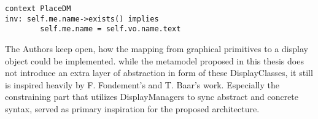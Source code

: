\begin{lstlisting}[language=OCL]
context PlaceDM
inv: self.me.name->exists() implies
        self.me.name = self.vo.name.text
\end{lstlisting}


The Authors keep open, how the mapping from graphical primitives to a display object could be implemented. while the metamodel proposed in this thesis does not introduce an extra layer of abstraction in form of these DisplayClasses, it still is inspired heavily by F. Fondement's and T. Baar's work. Especially the constraining part that utilizes DisplayManagers to sync abstract and concrete syntax, served as primary inspiration for the proposed architecture.


